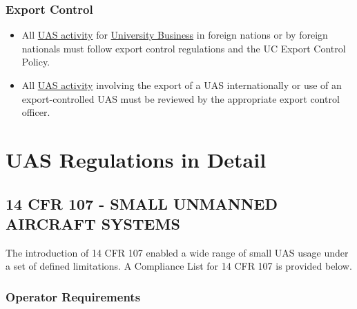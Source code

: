 \documentclass[
]{book}
\providecommand{\tightlist}{%
  \setlength{\itemsep}{0pt}\setlength{\parskip}{0pt}}
\begin{document}
\hypertarget{export-control}{%
\subsection{Export Control}\label{export-control}}

\begin{itemize}
\tightlist
\item
  All \protect\hyperlink{UASactivity}{UAS activity} for \protect\hyperlink{UB}{University Business} in foreign nations or by foreign nationals must follow export control regulations and the UC Export Control Policy.
\item
  All \protect\hyperlink{UASactivity}{UAS activity} involving the export of a UAS internationally or use of an export-controlled UAS must be reviewed by the appropriate export control officer.
\end{itemize}

\hypertarget{ch-UAS-regs-details}{%
\chapter{UAS Regulations in Detail}\label{ch-UAS-regs-details}}

\hypertarget{s-part107}{%
\section{14 CFR 107 - SMALL UNMANNED AIRCRAFT SYSTEMS}\label{s-part107}}

The introduction of 14 CFR 107 enabled a wide range of small UAS usage under a set of defined limitations. A Compliance List for 14 CFR 107 is provided below.

\hypertarget{operator-requirements}{%
\subsection{Operator Requirements}\label{operator-requirements}}
\end{document}
